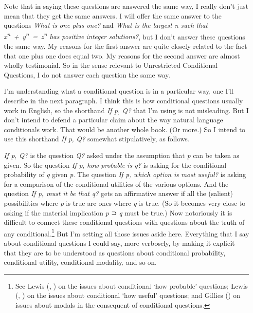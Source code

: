 \documentclass[
  12pt,
  letterpaper,
]{scrbook}
\begin{document}
Note that in saying these questions are answered the same way, I really
don't just mean that they get the same answers. I will offer the same
answer to the questions \emph{What is one plus one?} and \emph{What is
the largest n such that
x\textsuperscript{n}~+~y\textsuperscript{n}~=~z\textsuperscript{n} has
positive integer solutions?}, but I don't answer these questions the
same way. My reasons for the first answer are quite closely related to
the fact that one plus one does equal two. My reasons for the second
answer are almost wholly testimonial. So in the sense relevant to
Unrestricted Conditional Questions, I do not answer each question the
same way.

I'm understanding what a conditional question is in a particular way,
one I'll describe in the next paragraph. I think this is how conditional
questions usually work in English, so the shorthand \emph{If p, Q?} that
I'm using is not misleading. But I don't intend to defend a particular
claim about the way natural language conditionals work. That would be
another whole book. (Or more.) So I intend to use this shorthand
\emph{If p, Q?} somewhat stipulatively, as follows.

\emph{If p, Q?} is the question \emph{Q?} asked under the assumption
that \emph{p} can be taken as given. So the question \emph{If p, how
probable is q?} is asking for the conditional probability of \emph{q}
given \emph{p}. The question \emph{If p, which option is most useful?}
is asking for a comparison of the conditional utilities of the various
options. And the question \emph{If p, must it be that q?} gets an
affirmative answer if all the (salient) possibilities where \emph{p} is
true are ones where \emph{q} is true. (So it becomes very close to
asking if the material implication \emph{p} ⊃ \emph{q} must be true.)
Now notoriously it is difficult to connect these conditional questions
with questions about the truth of any conditional.\footnote{See Lewis
  (, ) on
  the issues about conditional `how probable' questions; Lewis
  (, ) on
  the issues about conditional `how useful' questions; and Gillies
  () on issues about modals in the
  consequent of conditional questions.} But I'm setting all those issues
aside here. Everything that I say about conditional questions I could
say, more verbosely, by making it explicit that they are to be
understood as questions about conditional probability, conditional
utility, conditional modality, and so on.
\end{document}
